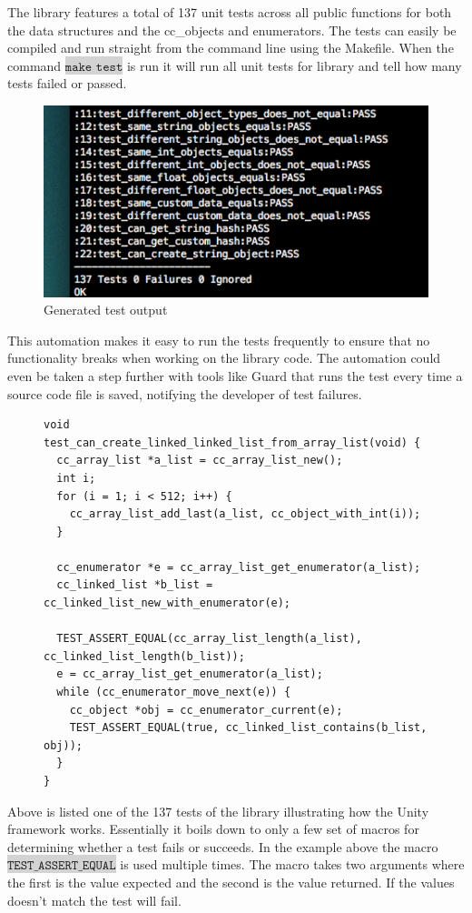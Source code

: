 \documentclass[table]{ituthesis}
\newcommand{\highlight}[1]{\colorbox{lightGray}{$\displaystyle \texttt{#1}$}}
\begin{document}
	The library features a total of 137 unit tests across all public functions for both the data structures and the cc\_objects and enumerators. The tests can easily be compiled and run straight from the command line using the Makefile. When the command \highlight{make test} is run it will run all unit tests for library and tell how many tests failed or passed.
	
	\begin{figure}[ht!]
		\begin{center}
			\includegraphics[scale=0.7]{images/test_output.png}
			\caption{Generated test output}
		\end{center}
		\label{fig:generate_test_output}
	\end{figure}
	
	This automation makes it easy to run the tests frequently to ensure that no functionality breaks when working on the library code. The automation could even be taken a step further with tools like Guard that runs the test every time a source code file is saved, notifying the developer of test failures.

\begin{figure}[ht!]
\begin{lstlisting}[label=test-example,caption=Example of unit test with Unity]
void test_can_create_linked_linked_list_from_array_list(void) {
  cc_array_list *a_list = cc_array_list_new();
  int i;
  for (i = 1; i < 512; i++) {
    cc_array_list_add_last(a_list, cc_object_with_int(i));
  }

  cc_enumerator *e = cc_array_list_get_enumerator(a_list);
  cc_linked_list *b_list = cc_linked_list_new_with_enumerator(e);

  TEST_ASSERT_EQUAL(cc_array_list_length(a_list), cc_linked_list_length(b_list));
  e = cc_array_list_get_enumerator(a_list);
  while (cc_enumerator_move_next(e)) {
    cc_object *obj = cc_enumerator_current(e);
    TEST_ASSERT_EQUAL(true, cc_linked_list_contains(b_list, obj));
  }
}
\end{lstlisting}
\end{figure}
	Above is listed one of the 137 tests of the library illustrating how the Unity framework works. Essentially it boils down to only a few set of macros for determining whether a test fails or succeeds. In the example above the macro \highlight{TEST\_ASSERT\_EQUAL} is used multiple times. The macro takes two arguments where the first is the value expected and the second is the value returned. If the values doesn't match the test will fail.
\end{document}
